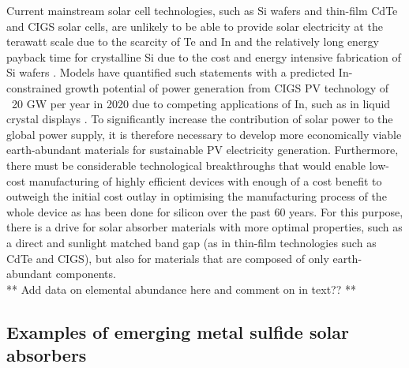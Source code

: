 \documentclass[11pt, twoside]{report}
\begin{document}

Current mainstream solar cell technologies, such as Si wafers and thin-film CdTe and CIGS solar cells, are unlikely to be able to provide solar electricity at the terawatt scale due to the scarcity of Te and In and the relatively long energy payback time for crystalline Si due to the cost and energy intensive fabrication of Si wafers \cite{CZTS_vs_MAPI}. 
Models have quantified such statements with a predicted In-constrained growth potential of power generation from CIGS PV technology of ~20 GW per year in 2020 due to competing applications of In, such as in liquid crystal displays \cite{culprit_5_3}.
To significantly increase the contribution of solar power to the global power supply, it is therefore necessary to develop more economically viable earth-abundant materials for sustainable PV electricity generation. Furthermore, there must be considerable technological breakthroughs that would enable low-cost manufacturing of highly efficient devices with enough of a cost benefit to outweigh the initial cost outlay in optimising the manufacturing process of the whole device as has been done for silicon over the past 60 years. For this purpose, there is a drive for solar absorber materials with more optimal properties, such as a direct and sunlight matched band gap (as in thin-film technologies such as CdTe and CIGS), but also for materials that are composed of only earth-abundant components.\\

** Add data on elemental abundance here and comment on in text?? **

\subsection{Examples of emerging metal sulfide solar absorbers}
\end{document}
